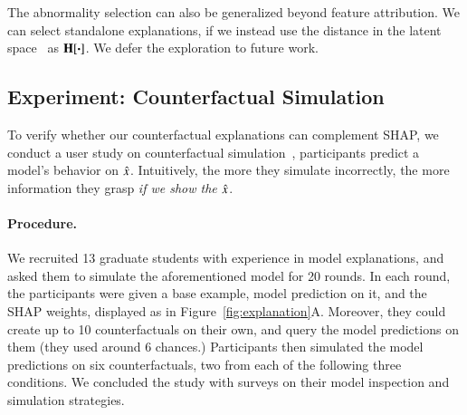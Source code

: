 The abnormality selection can also be generalized beyond feature attribution.
We can select standalone explanations, if we instead use the distance in the latent space~\cite{reimers-2019-sentence-bert} as $\operatorname*{\mathbf{H}}[\boldsymbol{\cdot}]$.
We defer the exploration to future work.


\subsection{Experiment: Counterfactual Simulation}
\label{subsec:exp_user_study}

To verify whether our counterfactual explanations can complement SHAP, we conduct a user study on counterfactual simulation~\cite{hase2020evaluating}, \ie participants predict a model's behavior on $\hat{x}$.
Intuitively, the more they simulate incorrectly, the more information they grasp \emph{if we show the $\hat{x}$}.


\paragraph{Procedure.}
We recruited 13 graduate students with experience in model explanations, and asked them to simulate the aforementioned \qqp model for 20 rounds.
In each round, the participants were given a base example, model prediction on it, and the SHAP weights, displayed as in Figure~\ref{fig:explanation}A.
Moreover, they could create up to 10 counterfactuals on their own, and query the model predictions on them (they used around 6 chances.)
Participants then simulated the model predictions on six counterfactuals, two from each of the following three conditions.
We concluded the study with surveys on their model inspection and simulation strategies.

